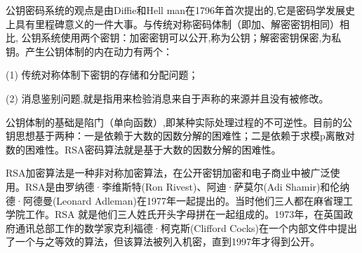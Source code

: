 \documentclass[a4paper]{article}  %
\begin{document}
\begin{sloppypar}




公钥密码系统的观点是由Diffie和Hell man在1796年首次提出的,它是密码学发展史上具有里程碑意义的一件大事。与传统对称密码体制（即加、解密密钥相同）相比,
公钥系统使用两个密钥：加密密钥可以公开,称为公钥；解密密钥保密,为私钥。产生公钥体制的内在动力有两个：

(1) 传统对称体制下密钥的存储和分配问题；

(2) 消息鉴别问题,就是指用来检验消息来自于声称的来源并且没有被修改。

公钥体制的基础是陷门（单向函数）,即某种实际处理过程的不可逆性。目前的公钥思想基于两种：一是依赖于大数的因数分解的困难性；二是依赖于求模p离散对数的困难性。RSA密码算法就是基于大数的因数分解的困难性。

RSA加密算法是一种非对称加密算法，在公开密钥加密和电子商业中被广泛使用。RSA是由罗纳德·李维斯特(Ron Rivest)、阿迪·萨莫尔(Adi
Shamir)和伦纳德·阿德曼(Leonard Adleman)在1977年一起提出的。当时他们三人都在麻省理工学院工作。RSA
就是他们三人姓氏开头字母拼在一起组成的。1973年，在英国政府通讯总部工作的数学家克利福德·柯克斯(Clifford
Cocks)在一个内部文件中提出了一个与之等效的算法，但该算法被列入机密，直到1997年才得到公开。


\end{sloppypar}
\end{document}
